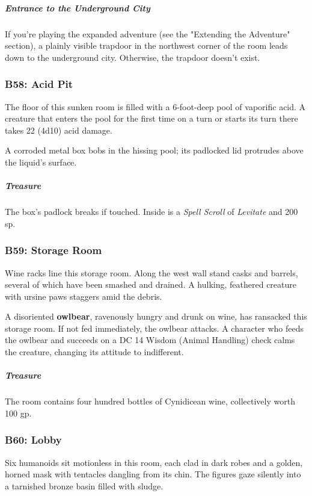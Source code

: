 \documentclass[10pt,a4paper,twoside,bg=print,twocolumn,openany,nodeprecatedcode]{dndbook}
\begin{document}
\subparagraph{Entrance to the Underground City}
If you're playing the expanded adventure (see the "Extending the Adventure" section), a plainly visible trapdoor in the northwest corner of the room leads down to the underground city. Otherwise, the trapdoor doesn't exist.

\subsubsection{B58: Acid Pit}
The floor of this sunken room is filled with a 6-foot-deep pool of vaporific acid. A creature that enters the pool for the first time on a turn or starts its turn there takes 22 (4d10) acid damage.

A corroded metal box bobs in the hissing pool; its padlocked lid protrudes above the liquid's surface.

\subparagraph{Treasure}
The box's padlock breaks if touched. Inside is a \textit{Spell Scroll} of \textit{Levitate} and 200 sp.

\subsubsection{B59: Storage Room}
\begin{DndReadAloud}{}
Wine racks line this storage room. Along the west wall stand casks and barrels, several of which have been smashed and drained. A hulking, feathered creature with ursine paws staggers amid the debris.

\end{DndReadAloud}

A disoriented \textbf{owlbear}, ravenously hungry and drunk on wine, has ransacked this storage room. If not fed immediately, the owlbear attacks. A character who feeds the owlbear and succeeds on a DC 14 Wisdom (Animal Handling) check calms the creature, changing its attitude to indifferent.

\subparagraph{Treasure}
The room contains four hundred bottles of Cynidicean wine, collectively worth 100 gp.

\subsubsection{B60: Lobby}
\begin{DndReadAloud}{}
Six humanoids sit motionless in this room, each clad in dark robes and a golden, horned mask with tentacles dangling from its chin. The figures gaze silently into a tarnished bronze basin filled with sludge.

\end{DndReadAloud}
\end{document}
